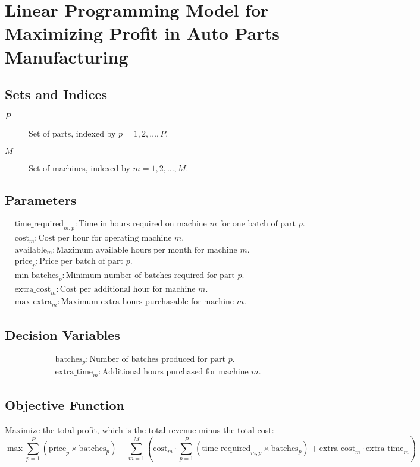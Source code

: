 \documentclass{article}
\begin{document}
\section*{Linear Programming Model for Maximizing Profit in Auto Parts Manufacturing}

\subsection*{Sets and Indices}
\begin{description}
    \item[$P$] Set of parts, indexed by $p = 1, 2, \ldots, P$.
    \item[$M$] Set of machines, indexed by $m = 1, 2, \ldots, M$.
\end{description}

\subsection*{Parameters}
\begin{align*}
    & \text{time\_required}_{m,p}: \text{Time in hours required on machine } m \text{ for one batch of part } p. \\
    & \text{cost}_{m}: \text{Cost per hour for operating machine } m. \\
    & \text{available}_{m}: \text{Maximum available hours per month for machine } m. \\
    & \text{price}_{p}: \text{Price per batch of part } p. \\
    & \text{min\_batches}_{p}: \text{Minimum number of batches required for part } p. \\
    & \text{extra\_cost}_{m}: \text{Cost per additional hour for machine } m. \\
    & \text{max\_extra}_{m}: \text{Maximum extra hours purchasable for machine } m.
\end{align*}

\subsection*{Decision Variables}
\begin{align*}
    & \text{batches}_{p}: \text{Number of batches produced for part } p. \\
    & \text{extra\_time}_{m}: \text{Additional hours purchased for machine } m.
\end{align*}

\subsection*{Objective Function}
Maximize the total profit, which is the total revenue minus the total cost:
\[
\max \sum_{p=1}^{P} (\text{price}_{p} \times \text{batches}_{p}) - 
\sum_{m=1}^{M} \left( \text{cost}_{m} \cdot \sum_{p=1}^{P} (\text{time\_required}_{m,p} \times \text{batches}_{p}) + \text{extra\_cost}_{m} \cdot \text{extra\_time}_{m} \right)
\]
\end{document}
